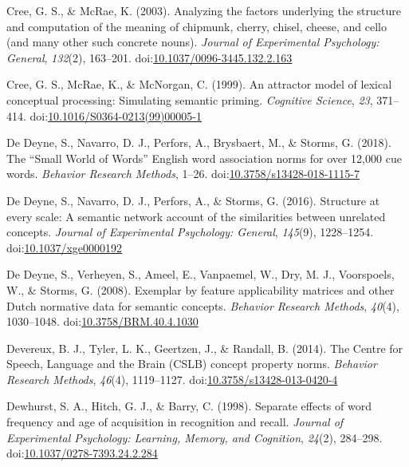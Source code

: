 \documentclass[english,,man]{apa6}
\begin{document}
\leavevmode\hypertarget{ref-Cree2003}{}%
Cree, G. S., \& McRae, K. (2003). Analyzing the factors underlying the structure and computation of the meaning of chipmunk, cherry, chisel, cheese, and cello (and many other such concrete nouns). \emph{Journal of Experimental Psychology: General}, \emph{132}(2), 163--201. doi:\href{https://doi.org/10.1037/0096-3445.132.2.163}{10.1037/0096-3445.132.2.163}

\leavevmode\hypertarget{ref-Cree1999}{}%
Cree, G. S., McRae, K., \& McNorgan, C. (1999). An attractor model of lexical conceptual processing: Simulating semantic priming. \emph{Cognitive Science}, \emph{23}, 371--414. doi:\href{https://doi.org/10.1016/S0364-0213(99)00005-1}{10.1016/S0364-0213(99)00005-1}

\leavevmode\hypertarget{ref-DeDeyne2018a}{}%
De Deyne, S., Navarro, D. J., Perfors, A., Brysbaert, M., \& Storms, G. (2018). The ``Small World of Words'' English word association norms for over 12,000 cue words. \emph{Behavior Research Methods}, 1--26. doi:\href{https://doi.org/10.3758/s13428-018-1115-7}{10.3758/s13428-018-1115-7}

\leavevmode\hypertarget{ref-DeDeyne2016}{}%
De Deyne, S., Navarro, D. J., Perfors, A., \& Storms, G. (2016). Structure at every scale: A semantic network account of the similarities between unrelated concepts. \emph{Journal of Experimental Psychology: General}, \emph{145}(9), 1228--1254. doi:\href{https://doi.org/10.1037/xge0000192}{10.1037/xge0000192}

\leavevmode\hypertarget{ref-DeDeyne2008}{}%
De Deyne, S., Verheyen, S., Ameel, E., Vanpaemel, W., Dry, M. J., Voorspoels, W., \& Storms, G. (2008). Exemplar by feature applicability matrices and other Dutch normative data for semantic concepts. \emph{Behavior Research Methods}, \emph{40}(4), 1030--1048. doi:\href{https://doi.org/10.3758/BRM.40.4.1030}{10.3758/BRM.40.4.1030}

\leavevmode\hypertarget{ref-Devereux2014}{}%
Devereux, B. J., Tyler, L. K., Geertzen, J., \& Randall, B. (2014). The Centre for Speech, Language and the Brain (CSLB) concept property norms. \emph{Behavior Research Methods}, \emph{46}(4), 1119--1127. doi:\href{https://doi.org/10.3758/s13428-013-0420-4}{10.3758/s13428-013-0420-4}

\leavevmode\hypertarget{ref-Dewhurst1998}{}%
Dewhurst, S. A., Hitch, G. J., \& Barry, C. (1998). Separate effects of word frequency and age of acquisition in recognition and recall. \emph{Journal of Experimental Psychology: Learning, Memory, and Cognition}, \emph{24}(2), 284--298. doi:\href{https://doi.org/10.1037/0278-7393.24.2.284}{10.1037/0278-7393.24.2.284}
\end{document}

